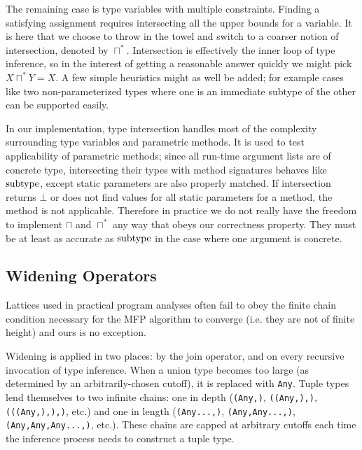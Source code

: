 The remaining case is type variables with multiple constraints. Finding
a satisfying assignment requires intersecting all the upper bounds for
a variable. It is here that we choose to throw in the towel and switch
to a coarser notion of intersection, denoted by $\sqcap^{*}$.
Intersection is effectively the inner loop of type inference, so in the
interest of getting a reasonable answer quickly we might pick
$X\sqcap^{*}Y=X$. A few simple heuristics might as well be added; for
example cases like two non-parameterized types where one is an immediate
subtype of the other can be supported easily.

In our implementation, type intersection handles most of the
complexity surrounding type variables and parametric methods. 
It is used to test applicability of parametric methods; since all
run-time argument lists are of concrete type, intersecting their types
with method signatures behaves like $\operatorname{subtype}$, except static parameters
are also properly matched. If intersection returns $\bot$ or does not find
values for all static parameters for a method, the method is not applicable.
Therefore in practice we do not really have the freedom to implement
$\sqcap$ and $\sqcap^{*}$ any way that obeys our correctness property.
They must be at least as accurate as $\operatorname{subtype}$ in the case where one
argument is concrete.


\subsection{Widening Operators}

Lattices used in practical program analyses often fail to obey the finite
chain condition necessary for the MFP algorithm to converge (i.e. they
are not of finite height) and ours is no exception.

Widening is applied in two places: by the join operator, and on every
recursive invocation of type inference.
When a union type becomes too large (as determined by an arbitrarily-chosen
cutoff), it is replaced with {\tt Any}. Tuple types lend themselves
to two infinite chains: one in depth ({\tt (Any,)}, {\tt ((Any,),)},
{\tt (((Any,),),)}, etc.) and one in length ({\tt (Any...,)},
{\tt (Any,Any...,)}, {\tt (Any,Any,Any...,)}, etc.). These chains are
capped at arbitrary cutoffs each time the inference process needs to
construct a tuple type.




